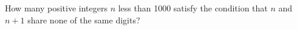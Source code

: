 How many positive integers $n$ less than 1000 satisfy the condition that $n$ and $n + 1$ share none of the same digits?
